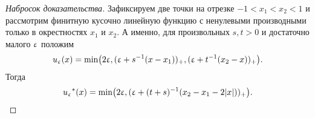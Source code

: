 \begin{proof}[Набросок доказательства]
Зафиксируем две точки на отрезке $-1 < x_1 < x_2 < 1$
и рассмотрим финитную кусочно линейную функцию с ненулевыми производными только в окрестностях $x_1$ и $x_2$.
А именно, для произвольных $s, t > 0$ и достаточно малого $\upvarepsilon$ положим
$$
u_\upvarepsilon(x) = \min \bigl( 2 \upvarepsilon, ( \upvarepsilon + s^{-1} (x - x_1))_+, ( \upvarepsilon + t^{-1} (x_2 - x) )_+ \bigr).
$$
Тогда
$$
{{u_\upvarepsilon}^*}(x) = \min \bigl( 2 \upvarepsilon, ( \upvarepsilon + ( t + s )^{-1} ( x_2 - x_1 - 2 |x| ) )_+ \bigr).
$$

%
%
%
%
%
%


\end{proof}
